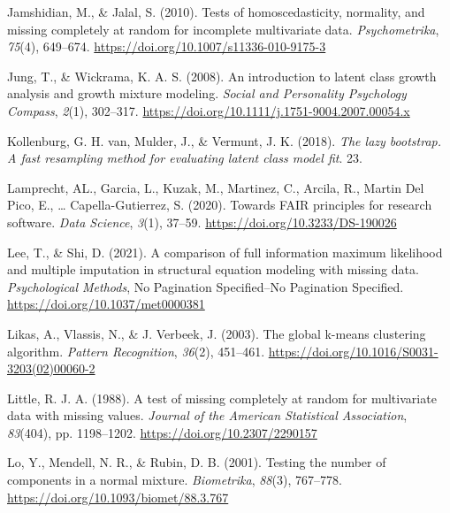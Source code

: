 \documentclass[
  ,man,floatsintext]{apa6}
\newlength{\cslhangindent}
\newlength{\cslentryspacingunit} %
\newenvironment{CSLReferences}[2] %
 {%
  \setlength{\parindent}{0pt}
  \ifodd #1
  \let\oldpar\par
  \def\par{\hangindent=\cslhangindent\oldpar}
  \fi
  \setlength{\parskip}{#2\cslentryspacingunit}
 }%
 {}
\begin{document}
\begin{CSLReferences}{1}{0}
\leavevmode{}%
Jamshidian, M., \& Jalal, S. (2010). Tests of homoscedasticity, normality, and missing completely at random for incomplete multivariate data. \emph{Psychometrika}, \emph{75}(4), 649--674. \url{https://doi.org/10.1007/s11336-010-9175-3}

\leavevmode{}%
Jung, T., \& Wickrama, K. A. S. (2008). An introduction to latent class growth analysis and growth mixture modeling. \emph{Social and Personality Psychology Compass}, \emph{2}(1), 302--317. \url{https://doi.org/10.1111/j.1751-9004.2007.00054.x}

\leavevmode{}%
Kollenburg, G. H. van, Mulder, J., \& Vermunt, J. K. (2018). \emph{The lazy bootstrap. A fast resampling method for evaluating latent class model fit}. 23.

\leavevmode{}%
Lamprecht, AL., Garcia, L., Kuzak, M., Martinez, C., Arcila, R., Martin Del Pico, E., \ldots{} Capella-Gutierrez, S. (2020). Towards {FAIR} principles for research software. \emph{Data Science}, \emph{3}(1), 37--59. \url{https://doi.org/10.3233/DS-190026}

\leavevmode{}%
Lee, T., \& Shi, D. (2021). A comparison of full information maximum likelihood and multiple imputation in structural equation modeling with missing data. \emph{Psychological Methods}, No Pagination Specified--No Pagination Specified. \url{https://doi.org/10.1037/met0000381}

\leavevmode{}%
Likas, A., Vlassis, N., \& J. Verbeek, J. (2003). The global k-means clustering algorithm. \emph{Pattern Recognition}, \emph{36}(2), 451--461. \url{https://doi.org/10.1016/S0031-3203(02)00060-2}

\leavevmode{}%
Little, R. J. A. (1988). A test of missing completely at random for multivariate data with missing values. \emph{Journal of the American Statistical Association}, \emph{83}(404), pp. 1198--1202. \url{https://doi.org/10.2307/2290157}

\leavevmode{}%
Lo, Y., Mendell, N. R., \& Rubin, D. B. (2001). Testing the number of components in a normal mixture. \emph{Biometrika}, \emph{88}(3), 767--778. \url{https://doi.org/10.1093/biomet/88.3.767}


\end{CSLReferences}
\end{document}
